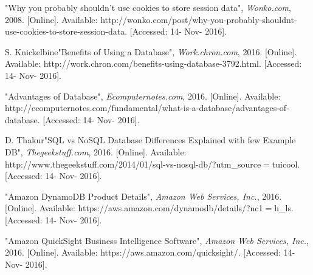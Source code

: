 \begin{thebibliography}{1}
        "Why you probably shouldn't use cookies to store session data", \textit{Wonko.com}, 2008. [Online]. Available: http://wonko.com/post/why-you-probably-shouldnt-use-cookies-to-store-session-data. [Accessed: 14- Nov- 2016].
        
        S. Knickelbine"Benefits of Using a Database", \textit{Work.chron.com}, 2016. [Online]. Available: http://work.chron.com/benefits-using-database-3792.html. [Accessed: 14- Nov- 2016].
        
        "Advantages of Database", \textit{Ecomputernotes.com}, 2016. [Online]. Available: http://ecomputernotes.com/fundamental/what-is-a-database/advantages-of-database. [Accessed: 14- Nov- 2016].
        
        D. Thakur"SQL vs NoSQL Database Differences Explained with few Example DB", \textit{Thegeekstuff.com}, 2016. [Online]. Available: http://www.thegeekstuff.com/2014/01/sql-vs-nosql-db/?utm\_source$=$tuicool. [Accessed: 14- Nov- 2016].
        
        "Amazon DynamoDB Product Details", \textit{Amazon Web Services, Inc.}, 2016. [Online]. Available: https://aws.amazon.com/dynamodb/details/?nc1{$=$}h\_ls. [Accessed: 14- Nov- 2016].
        
        "Amazon QuickSight Business Intelligence Software", \textit{Amazon Web Services, Inc.}, 2016. [Online]. Available: https://aws.amazon.com/quicksight/. [Accessed: 14- Nov- 2016].
    \end{thebibliography}